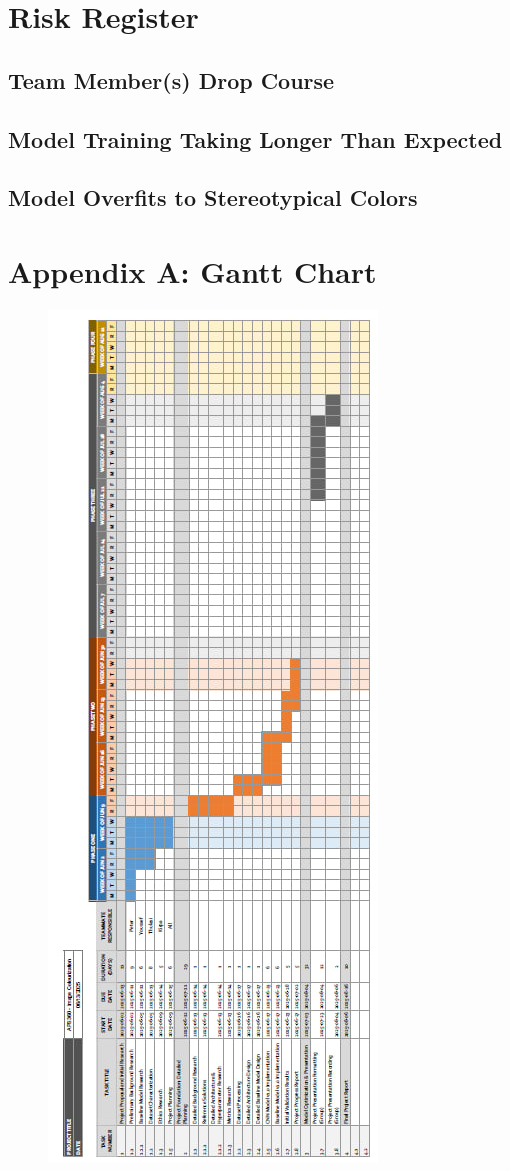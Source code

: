 \documentclass{article} %
\begin{document}
\section{Risk Register}
\label{risk_register}

\subsection{Team Member(s) Drop Course}

\subsection{Model Training Taking Longer Than Expected}

\subsection{Model Overfits to Stereotypical Colors}

\label{last_page}




\section{Appendix A: Gantt Chart}
\begin{figure}[htbp]
  \centering
  \includegraphics[width=0.58\linewidth]{Figs/gant-chart-full.jpg}
  \label{fig:gantt_chart}
\end{figure}
\end{document}
